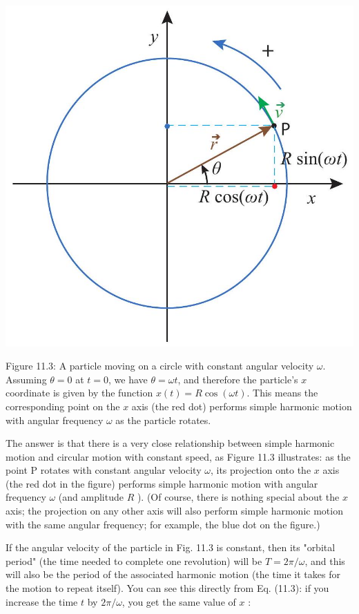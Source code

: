 \documentclass[10pt]{article}
\begin{document}
\begin{center}
\includegraphics[max width=\textwidth]{2024_09_14_9969b06773f10b6936e8g-274}
\end{center}

Figure 11.3: A particle moving on a circle with constant angular velocity $\omega$. Assuming $\theta=0$ at $t=0$, we have $\theta=\omega t$, and therefore the particle's $x$ coordinate is given by the function $x(t)=R \cos (\omega t)$. This means the corresponding point on the $x$ axis (the red dot) performs simple harmonic motion with angular frequency $\omega$ as the particle rotates.

The answer is that there is a very close relationship between simple harmonic motion and circular motion with constant speed, as Figure 11.3 illustrates: as the point P rotates with constant angular velocity $\omega$, its projection onto the $x$ axis (the red dot in the figure) performs simple harmonic motion with angular frequency $\omega$ (and amplitude $R$ ). (Of course, there is nothing special about the $x$ axis; the projection on any other axis will also perform simple harmonic motion with the same angular frequency; for example, the blue dot on the figure.)

If the angular velocity of the particle in Fig. 11.3 is constant, then its "orbital period" (the time needed to complete one revolution) will be $T=2 \pi / \omega$, and this will also be the period of the associated harmonic motion (the time it takes for the motion to repeat itself). You can see this directly from Eq. (11.3): if you increase the time $t$ by $2 \pi / \omega$, you get the same value of $x$ :
\end{document}
